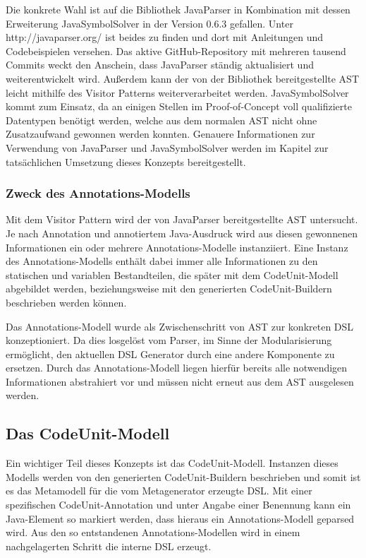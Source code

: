 \documentclass[12pt,oneside,a4paper,parskip]{scrbook}
\begin{document}
Die konkrete Wahl ist auf die Bibliothek JavaParser in Kombination mit dessen Erweiterung JavaSymbolSolver in der Version 0.6.3 gefallen. Unter http://javaparser.org/ ist beides zu finden und dort mit Anleitungen und Codebeispielen versehen. Das aktive GitHub-Repository mit mehreren tausend Commits weckt den Anschein, dass JavaParser ständig aktualisiert und weiterentwickelt wird. Außerdem kann der von der Bibliothek bereitgestellte AST leicht mithilfe des Visitor Patterns weiterverarbeitet werden. JavaSymbolSolver kommt zum Einsatz, da an einigen Stellen im Proof-of-Concept voll qualifizierte Datentypen benötigt werden, welche aus dem normalen AST nicht ohne Zusatzaufwand gewonnen werden konnten. Genauere Informationen zur Verwendung von JavaParser und JavaSymbolSolver werden im Kapitel zur tatsächlichen Umsetzung dieses Konzepts bereitgestellt.

\subsubsection{Zweck des Annotations-Modells}

Mit dem Visitor Pattern wird der von JavaParser bereitgestellte AST untersucht. Je nach Annotation und annotiertem Java-Ausdruck wird aus diesen gewonnenen Informationen ein oder mehrere Annotations-Modelle instanziiert. Eine Instanz des Annotations-Modells enthält dabei immer alle Informationen zu den statischen und variablen Bestandteilen, die später mit dem CodeUnit-Modell abgebildet werden, beziehungsweise mit den generierten CodeUnit-Buildern beschrieben werden können.

Das Annotations-Modell wurde als Zwischenschritt von AST zur konkreten DSL konzeptioniert. Da dies losgelöst vom Parser, im Sinne der Modularisierung ermöglicht, den aktuellen DSL Generator durch eine andere Komponente zu ersetzen. Durch das Annotations-Modell liegen hierfür bereits alle notwendigen Informationen abstrahiert vor und müssen nicht erneut aus dem AST ausgelesen werden.

\subsection{Das CodeUnit-Modell}

Ein wichtiger Teil dieses Konzepts ist das CodeUnit-Modell. Instanzen dieses Modells werden von den generierten CodeUnit-Buildern beschrieben und somit ist es das Metamodell für die vom Metagenerator erzeugte DSL. Mit einer spezifischen CodeUnit-Annotation und unter Angabe einer Benennung kann ein Java-Element so markiert werden, dass hieraus ein Annotations-Modell geparsed wird. Aus den so entstandenen Annotations-Modellen wird in einem nachgelagerten Schritt die interne DSL erzeugt.
\end{document}

